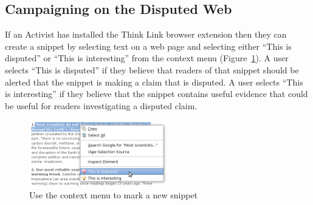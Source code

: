 \documentclass{chi2009}
\newcommand{\todo}[1]{}
\begin{document}
\todo{Talk about searches}
\todo{Cite work on collaborative filtering}
\todo{Mention the sidebar?}


\subsection{Campaigning on the Disputed Web}

If an Activist has installed the Think Link browser extension then they can create a snippet by selecting text on a web page and selecting either ``This is disputed'' or ``This is interesting'' from the context menu (Figure~\ref{createprocess}). A user selects ``This is disputed'' if they believe that readers of that snippet should be alerted that the snippet is making a claim that is disputed. A user selects ``This is interesting'' if they believe that the snippet contains useful evidence that could be useful for readers investigating a disputed claim. 

\begin{figure}[tb]
	\begin{center}
	\includegraphics[width=6cm]{../screenshots/v2_snipmark.png}
	\caption{Use the context menu to mark a new snippet}
	\label{createprocess}
	\end{center}
\end{figure}
\end{document}
